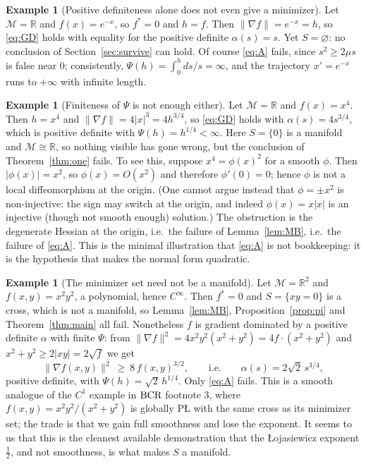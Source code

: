 \documentclass[11pt]{article}
\theoremstyle{plain}
\theoremstyle{definition}
\newtheorem{ex}[thm]{Example}
\theoremstyle{remark}
\newcommand{\M}{\mathcal{M}}
\newcommand{\R}{\mathbb{R}}
\newcommand{\bcr}{\textup{BCR}}
\begin{document}
\begin{ex}[Positive definiteness alone does not even give a minimizer]\label{ex:exp}
Let $\M=\R$ and $f(x)=e^{-x}$, so $f^*=0$ and $h=f$. Then
$\|\nabla f\| = e^{-x} = h$, so \eqref{eq:GD} holds with equality for the
positive definite $\alpha(s)=s$. Yet $S=\varnothing$: no conclusion of
Section~\ref{sec:survive} can hold. Of course \eqref{eq:A} fails, since
$s^2 \ge 2\mu s$ is false near $0$; consistently,
$\Psi(h)=\int_0^h ds/s = \infty$, and the trajectory
$x' = e^{-x}$ runs to $+\infty$ with infinite length.
\end{ex}

\begin{ex}[Finiteness of $\Psi$ is not enough either]\label{ex:x4}
Let $\M=\R$ and $f(x)=x^4$. Then $h=x^4$ and $\|\nabla f\| = 4|x|^3 = 4h^{3/4}$,
so \eqref{eq:GD} holds with $\alpha(s)=4s^{3/4}$, which is positive definite
with $\Psi(h) = h^{1/4} < \infty$. Here $S=\{0\}$ is a manifold and
$\M\cong\R$, so nothing visible has gone wrong, but the conclusion of
Theorem~\ref{thm:one} fails. To see this, suppose $x^4=\phi(x)^2$ for a smooth
$\phi$. Then $|\phi(x)|=x^2$, so $\phi(x)=O(x^2)$ and therefore $\phi'(0)=0$;
hence $\phi$ is not a local diffeomorphism at the origin. (One cannot argue
instead that $\phi=\pm x^2$ is non-injective: the sign may switch at the origin,
and indeed $\phi(x)=x|x|$ is an injective (though not smooth enough)
solution.) The obstruction is
the degenerate Hessian at the origin, i.e.\ the failure of Lemma~\ref{lem:MB},
i.e.\ the failure of \eqref{eq:A}. This is the minimal illustration that
\eqref{eq:A} is not bookkeeping: it is the hypothesis that makes the normal form
quadratic.
\end{ex}

\begin{ex}[The minimizer set need not be a manifold]\label{ex:cross}
Let $\M=\R^2$ and $f(x,y) = x^2y^2$, a polynomial, hence $C^\infty$. Then
$f^*=0$ and $S = \{xy=0\}$ is a cross, which is not a manifold, so
Lemma~\ref{lem:MB}, Proposition~\ref{prop:pi} and Theorem~\ref{thm:main} all
fail. Nonetheless $f$ is gradient dominated by a positive definite $\alpha$ with
finite $\Psi$: from $\|\nabla f\|^2 = 4x^2y^2(x^2+y^2) = 4f\cdot(x^2+y^2)$ and
$x^2+y^2 \ge 2|xy| = 2\sqrt f$ we get
\[
  \|\nabla f(x,y)\|^2 \ \ge\ 8\, f(x,y)^{3/2} ,
  \qquad\text{i.e.}\qquad \alpha(s) = 2\sqrt2\, s^{3/4} ,
\]
positive definite, with $\Psi(h) = \sqrt2\,h^{1/4}$. Only \eqref{eq:A} fails.
This is a smooth analogue of the $C^1$ example in $\bcr$ footnote 3, where
$f(x,y)=x^2y^2/(x^2+y^2)$ is globally P\L{} with the same cross as its minimizer
set; the trade is that we gain full smoothness and lose the exponent. It seems to
us that this is the cleanest available demonstration that the \L{}ojasiewicz
exponent $\tfrac12$, and not smoothness, is what makes $S$ a manifold.
\end{ex}
\end{document}
